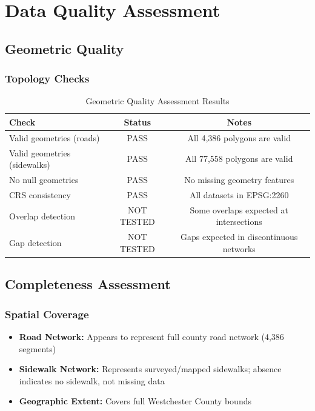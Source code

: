\documentclass[11pt,letterpaper]{article}
\begin{document}
\section{Data Quality Assessment}

\subsection{Geometric Quality}

\subsubsection{Topology Checks}

\begin{table}[H]
\centering
\begin{tabular}{lcc}
\toprule
\textbf{Check} & \textbf{Status} & \textbf{Notes} \\
\midrule
Valid geometries (roads) & PASS & All 4,386 polygons are valid \\
Valid geometries (sidewalks) & PASS & All 77,558 polygons are valid \\
No null geometries & PASS & No missing geometry features \\
CRS consistency & PASS & All datasets in EPSG:2260 \\
Overlap detection & NOT TESTED & Some overlaps expected at intersections \\
Gap detection & NOT TESTED & Gaps expected in discontinuous networks \\
\bottomrule
\end{tabular}
\caption{Geometric Quality Assessment Results}
\label{tab:quality}
\end{table}

\subsection{Completeness Assessment}

\subsubsection{Spatial Coverage}

\begin{itemize}
    \item \textbf{Road Network:} Appears to represent full county road network (4,386 segments)
    \item \textbf{Sidewalk Network:} Represents surveyed/mapped sidewalks; absence indicates no sidewalk, not missing data
    \item \textbf{Geographic Extent:} Covers full Westchester County bounds
\end{itemize}
\end{document}
